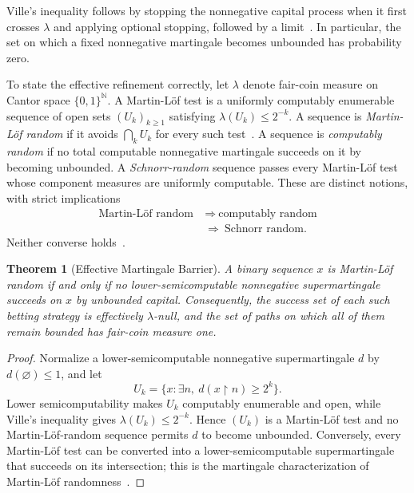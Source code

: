 \documentclass[aps,pra,reprint,superscriptaddress,amsmath,amssymb,floatfix]{revtex4-2}
\theoremstyle{plain}
\newtheorem{theorem}{Theorem}
\theoremstyle{definition}
\theoremstyle{remark}
\begin{document}
Ville's inequality follows by stopping the nonnegative capital process when it
first crosses \(\lambda\) and applying optional stopping, followed by a
limit~\cite{Ville1939}. In particular, the set on which a fixed nonnegative
martingale becomes unbounded has probability zero.

To state the effective refinement correctly, let \(\lambda\) denote fair-coin
measure on Cantor space \(\{0,1\}^{\mathbb N}\). A Martin-L\"of test is a
uniformly computably enumerable sequence of open sets
\((U_k)_{k\geq1}\) satisfying \(\lambda(U_k)\leq2^{-k}\). A sequence is
\emph{Martin-L\"of random} if it avoids \(\bigcap_k U_k\) for every such
test~\cite{MartinLof1966}. A sequence is \emph{computably random} if no total
computable nonnegative martingale succeeds on it by becoming unbounded. A
\emph{Schnorr-random} sequence passes every Martin-L\"of test whose component
measures are uniformly computable. These are distinct notions, with strict
implications
\begin{equation}
  \begin{aligned}
    \text{Martin-L\"of random}
      &\ \Longrightarrow\ \text{computably random}\\
      &\ \Longrightarrow\ \text{Schnorr random}.
  \end{aligned}
  \label{eq:randomhierarchy}
\end{equation}
Neither converse holds~\cite{schnorr1,Nies2009,DH}.

\begin{theorem}[Effective Martingale Barrier]
  \label{thm:effective}
  A binary sequence \(x\) is Martin-L\"of random if and only if no
  lower-semicomputable nonnegative supermartingale succeeds on \(x\) by
  unbounded capital. Consequently, the success set of each such betting
  strategy is effectively \(\lambda\)-null, and the set of paths on which all
  of them remain bounded has fair-coin measure one.
\end{theorem}

\begin{proof}
Normalize a lower-semicomputable nonnegative supermartingale \(d\) by
\(d(\varnothing)\leq1\), and let
\[
  U_k=\{x:\exists n,\ d(x{\upharpoonright}n)\geq2^k\}.
\]
Lower semicomputability makes \(U_k\) computably enumerable and open, while
Ville's inequality gives \(\lambda(U_k)\leq2^{-k}\). Hence
\((U_k)\) is a Martin-L\"of test and no Martin-L\"of-random sequence permits
\(d\) to become unbounded. Conversely, every Martin-L\"of test can be converted
into a lower-semicomputable supermartingale that succeeds on its intersection;
this is the martingale characterization of Martin-L\"of
randomness~\cite{calude:02,Nies2009}.
\end{proof}
\end{document}
